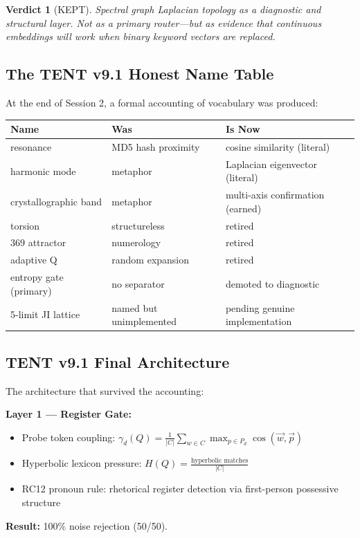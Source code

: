 \documentclass[11pt]{article}
\newtheorem{verdict}{Verdict}
\begin{document}
\begin{verdict}[\textcolor{keepgreen}{KEPT}]
Spectral graph Laplacian topology as a \textit{diagnostic} and \textit{structural} layer. Not as a primary router---but as evidence that continuous embeddings will work when binary keyword vectors are replaced.
\end{verdict}

\subsection{The TENT v9.1 Honest Name Table}

At the end of Session 2, a formal accounting of vocabulary was produced:

\begin{longtable}{lll}
\toprule
\textbf{Name} & \textbf{Was} & \textbf{Is Now} \\
\midrule
resonance & MD5 hash proximity & cosine similarity (literal) \\
harmonic mode & metaphor & Laplacian eigenvector (literal) \\
crystallographic band & metaphor & multi-axis confirmation (earned) \\
torsion & structureless & retired \\
369 attractor & numerology & retired \\
adaptive Q & random expansion & retired \\
entropy gate (primary) & no separator & demoted to diagnostic \\
5-limit JI lattice & named but unimplemented & pending genuine implementation \\
\bottomrule
\end{longtable}

\subsection{TENT v9.1 Final Architecture}

The architecture that survived the accounting:

\textbf{Layer 1 --- Register Gate:}
\begin{itemize}
  \item Probe token coupling: $\gamma_d(Q) = \frac{1}{|C|} \sum_{w \in C} \max_{p \in P_d} \cos(\vec{w}, \vec{p})$
  \item Hyperbolic lexicon pressure: $H(Q) = \frac{\text{hyperbolic matches}}{|C|}$
  \item RC12 pronoun rule: rhetorical register detection via first-person possessive structure
\end{itemize}
\textbf{Result:} 100\% noise rejection (50/50).
\end{document}
